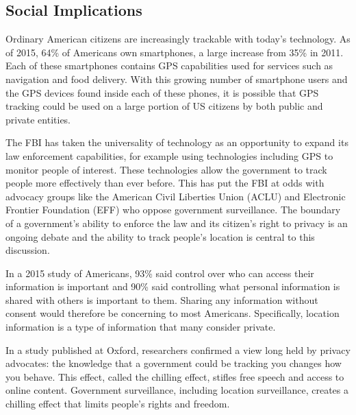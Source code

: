 \documentclass[12pt]{article}
\begin{document}
\begin{multicols}{2}

\section{Social Implications}
Ordinary American citizens are increasingly trackable with today's technology. As of 2015, 64\% of Americans own smartphones, a large increase from 35\% in 2011. \cite{pew}
Each of these smartphones contains GPS capabilities used for services such as navigation and food delivery. \cite{iphone}
With this growing number of smartphone users and the GPS devices found inside 
each of these phones, it is possible that GPS tracking could be used on a large portion
of US citizens by both public and private entities. 

The FBI has taken the universality of technology as an opportunity to expand its law enforcement capabilities, for example using technologies including GPS to monitor people of interest. \cite{acluamicus}
These technologies allow the government to track people more effectively than ever before. \cite{aclu_privacy}
This has put the FBI at odds with advocacy groups like the American Civil Liberties Union (ACLU) and Electronic Frontier Foundation (EFF) who oppose government surveillance. \cite{eff_privacy, aclu_privacy}
The boundary of a government's ability to enforce the law and its citizen's right to privacy is an ongoing debate and the ability to track people's location is central to this discussion. \cite{acluamicus}

In a 2015 study of Americans, 93\% said control over who can access their information is important and 90\% said controlling what personal information is shared with others is important to them. \cite{pew} 
Sharing any information without consent would therefore be concerning to most Americans.
Specifically, location information is a type of information that many consider private. \cite{acluamicus} 

In a study published at Oxford, researchers confirmed a view long
held by privacy advocates: the knowledge that a government could be tracking you changes how
you behave. \cite{chillingeffect} This effect, called the chilling effect, stifles free speech
and access to online content. \cite{chillingeffect}
Government surveillance, including location surveillance, creates a chilling effect that limits people's rights and freedom. \cite{chillingeffect}


\end{multicols}
\end{document}
